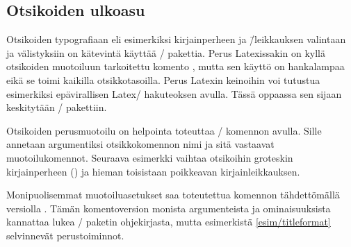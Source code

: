 \subsection{Otsikoiden ulkoasu}
\label{luku/otsikot-ulkoasu}

Otsikoiden typografiaan eli esimerkiksi kirjainperheen ja \=/leikkauksen
valintaan ja välistyksiin on kätevintä käyttää \-/
pakettia. Perus Latexissakin on kyllä otsikoiden
muotoiluun tarkoitettu komento , mutta sen
käyttö on hankalampaa eikä se toimi kaikilla otsikkotasoilla. Perus
Latexin keinoihin voi tutustua esimerkiksi epävirallisen Latex\-/
hakuteoksen \textcite{unoffref} avulla. Tässä oppaassa sen sijaan
keskitytään \-/ pakettiin.

Otsikoiden perusmuotoilu on helpointa toteuttaa
\-/ komennon avulla. Sille annetaan argumentiksi
otsikkokomennon nimi ja sitä vastaavat muotoilukomennot. Seuraava
esimerkki vaihtaa otsikoihin groteskin kirjainperheen
() ja hieman toisistaan poikkeavan kirjainleikkauksen.

\begin{koodilohkosis}
\titleformat*{\section}      {\sffamily\bfseries\Large}
\titleformat*{\subsection}   {\sffamily\bfseries\itshape\large}
\titleformat*{\subsubsection}{\sffamily\bfseries\normalsize}
\end{koodilohkosis}

Monipuolisemmat muotoiluasetukset saa toteutettua komennon tähdettömällä
versiolla . Tämän komentoversion monista
argumenteista ja ominaisuuksista kannattaa lukea \-/
paketin ohjekirjasta, mutta esimerkistä \ref{esim/titleformat}
selvinnevät perustoiminnot.

